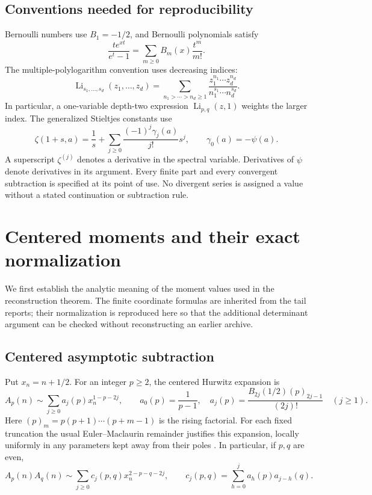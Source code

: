 \documentclass[11pt]{article}
\theoremstyle{definition}
\theoremstyle{remark}
\numberwithin{equation}{section}
\DeclareMathOperator{\Li}{Li}
\begin{document}
\subsection{Conventions needed for reproducibility}

Bernoulli numbers use $B_1=-1/2$, and Bernoulli polynomials satisfy
\[
 \frac{te^{xt}}{e^t-1}=\sum_{m\ge0}B_m(x)\frac{t^m}{m!}.
\]
The multiple-polylogarithm convention uses decreasing indices:
\[
 \Li_{s_1,\ldots,s_d}(z_1,\ldots,z_d)
 =\sum_{n_1>\cdots>n_d\ge1}
       \frac{z_1^{n_1}\cdots z_d^{n_d}}
            {n_1^{s_1}\cdots n_d^{s_d}}.
\]
In particular, a one-variable depth-two expression
$\Li_{p,q}(z,1)$ weights the larger index. The generalized Stieltjes
constants use
\[
 \zeta(1+s,a)=\frac1s+
       \sum_{j\ge0}\frac{(-1)^j\gamma_j(a)}{j!}s^j,
 \qquad \gamma_0(a)=-\psi(a).
\]
A superscript $\zeta^{(j)}$ denotes a derivative in the spectral
variable. Derivatives of $\psi$ denote derivatives in its argument.
Every finite part and every convergent subtraction is specified at
its point of use. No divergent series is assigned a value without
a stated continuation or subtraction rule.


\section{Centered moments and their exact normalization}
\label{sec:foundation}

We first establish the analytic meaning of the moment values used in
the reconstruction theorem. The finite coordinate formulas are
inherited from the tail reports; their normalization is reproduced
here so that the additional determinant argument can be checked
without reconstructing an earlier archive.

\subsection{Centered asymptotic subtraction}

Put $x_n=n+1/2$. For an integer $p\ge2$, the centered Hurwitz
expansion is
\begin{equation}\label{found:asymptotic}
 A_p(n)\sim\sum_{j\ge0}a_j(p)x_n^{1-p-2j},\qquad
 a_0(p)=\frac1{p-1},\quad
 a_j(p)=\frac{B_{2j}(1/2)(p)_{2j-1}}{(2j)!}\quad(j\ge1).
\end{equation}
Here $(p)_m=p(p+1)\cdots(p+m-1)$ is the rising factorial.
For each fixed truncation the usual Euler--Maclaurin remainder
justifies this expansion, locally uniformly in any parameters kept
away from their poles \cite{DLMF}. In particular, if $p,q$ are even,
\begin{equation}\label{found:product-expansion}
 A_p(n)A_q(n)\sim
 \sum_{j\ge0}c_j(p,q)x_n^{2-p-q-2j},\qquad
 c_j(p,q)=\sum_{h=0}^j a_h(p)a_{j-h}(q).
\end{equation}
\end{document}
